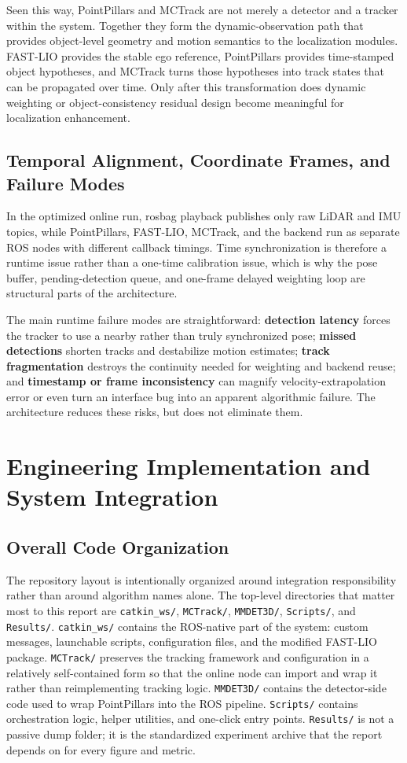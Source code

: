 \documentclass[a4paper,12pt]{article}
\begin{document}
Seen this way, PointPillars and MCTrack are not merely a detector and a tracker within the system. Together they form the dynamic-observation path that provides object-level geometry and motion semantics to the localization modules. FAST-LIO provides the stable ego reference, PointPillars provides time-stamped object hypotheses, and MCTrack turns those hypotheses into track states that can be propagated over time. Only after this transformation does dynamic weighting or object-consistency residual design become meaningful for localization enhancement.

\subsection{Temporal Alignment, Coordinate Frames, and Failure Modes}
In the optimized online run, rosbag playback publishes only raw LiDAR and IMU topics, while PointPillars, FAST-LIO, MCTrack, and the backend run as separate ROS nodes with different callback timings. Time synchronization is therefore a runtime issue rather than a one-time calibration issue, which is why the pose buffer, pending-detection queue, and one-frame delayed weighting loop are structural parts of the architecture.

The main runtime failure modes are straightforward: \textbf{detection latency} forces the tracker to use a nearby rather than truly synchronized pose; \textbf{missed detections} shorten tracks and destabilize motion estimates; \textbf{track fragmentation} destroys the continuity needed for weighting and backend reuse; and \textbf{timestamp or frame inconsistency} can magnify velocity-extrapolation error or even turn an interface bug into an apparent algorithmic failure. The architecture reduces these risks, but does not eliminate them.

\section{Engineering Implementation and System Integration}
\subsection{Overall Code Organization}
The repository layout is intentionally organized around integration responsibility rather than around algorithm names alone. The top-level directories that matter most to this report are \texttt{catkin\_ws/}, \texttt{MCTrack/}, \texttt{MMDET3D/}, \texttt{Scripts/}, and \texttt{Results/}. \texttt{catkin\_ws/} contains the ROS-native part of the system: custom messages, launchable scripts, configuration files, and the modified FAST-LIO package. \texttt{MCTrack/} preserves the tracking framework and configuration in a relatively self-contained form so that the online node can import and wrap it rather than reimplementing tracking logic. \texttt{MMDET3D/} contains the detector-side code used to wrap PointPillars into the ROS pipeline. \texttt{Scripts/} contains orchestration logic, helper utilities, and one-click entry points. \texttt{Results/} is not a passive dump folder; it is the standardized experiment archive that the report depends on for every figure and metric.
\end{document}
